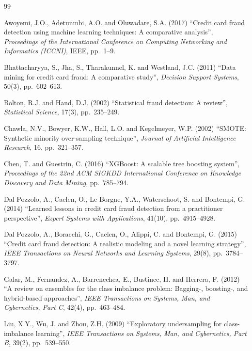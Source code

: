 \documentclass[12pt,a4paper]{report}
\begin{document}
\renewcommand{\bibname}{REFERENCES}
\begin{thebibliography}{99}

Awoyemi, J.O., Adetunmbi, A.O. and Oluwadare, S.A. (2017) ``Credit card fraud detection using machine learning techniques: A comparative analysis'', \textit{Proceedings of the International Conference on Computing Networking and Informatics (ICCNI)}, IEEE, pp.~1--9.

Bhattacharyya, S., Jha, S., Tharakunnel, K. and Westland, J.C. (2011) ``Data mining for credit card fraud: A comparative study'', \textit{Decision Support Systems}, 50(3), pp.~602--613.

Bolton, R.J. and Hand, D.J. (2002) ``Statistical fraud detection: A review'', \textit{Statistical Science}, 17(3), pp.~235--249.

Chawla, N.V., Bowyer, K.W., Hall, L.O. and Kegelmeyer, W.P. (2002) ``SMOTE: Synthetic minority over-sampling technique'', \textit{Journal of Artificial Intelligence Research}, 16, pp.~321--357.

Chen, T. and Guestrin, C. (2016) ``XGBoost: A scalable tree boosting system'', \textit{Proceedings of the 22nd ACM SIGKDD International Conference on Knowledge Discovery and Data Mining}, pp.~785--794.

Dal Pozzolo, A., Caelen, O., Le Borgne, Y.A., Waterschoot, S. and Bontempi, G. (2014) ``Learned lessons in credit card fraud detection from a practitioner perspective'', \textit{Expert Systems with Applications}, 41(10), pp.~4915--4928.

Dal Pozzolo, A., Boracchi, G., Caelen, O., Alippi, C. and Bontempi, G. (2015) ``Credit card fraud detection: A realistic modeling and a novel learning strategy'', \textit{IEEE Transactions on Neural Networks and Learning Systems}, 29(8), pp.~3784--3797.

Galar, M., Fernandez, A., Barrenechea, E., Bustince, H. and Herrera, F. (2012) ``A review on ensembles for the class imbalance problem: Bagging-, boosting-, and hybrid-based approaches'', \textit{IEEE Transactions on Systems, Man, and Cybernetics, Part C}, 42(4), pp.~463--484.

Liu, X.Y., Wu, J. and Zhou, Z.H. (2009) ``Exploratory undersampling for class-imbalance learning'', \textit{IEEE Transactions on Systems, Man, and Cybernetics, Part B}, 39(2), pp.~539--550.


\end{thebibliography}
\end{document}
